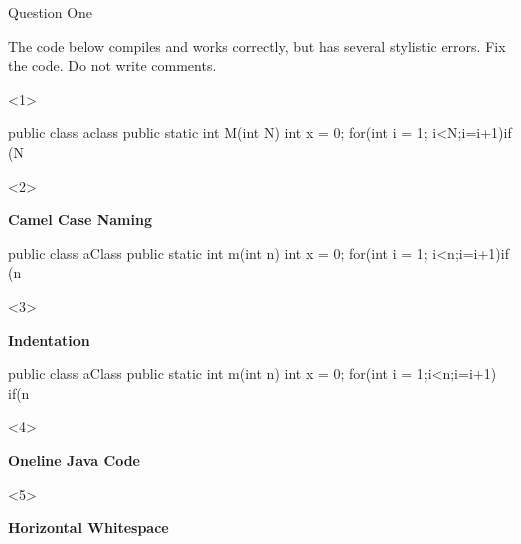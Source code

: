 \begin{frame}[t, fragile]{Question One} \vspace{4pt}

The code below compiles and works correctly, but has several stylistic errors. Fix the code. Do not write comments.

\begin{onlyenv}<1>

\begin{java}
public class aclass {
public static int M(int N) {
	int x = 0;
		for(int i = 1;
		i<N;i=i+1)if
(N%
}}
\end{java}

\end{onlyenv}

\begin{onlyenv}<2>

\textbf{Camel Case Naming}

\begin{java}
public class aClass {
public static int m(int n) {
	int x = 0;
		for(int i = 1;
		i<n;i=i+1)if
(n%
}}
\end{java}

\end{onlyenv}

\begin{onlyenv}<3>

\textbf{Indentation}

\begin{java}
public class aClass {
	public static int m(int n) {
		int x = 0;
		for(int i = 1;i<n;i=i+1)
			if(n%
}}
\end{java}

\end{onlyenv}

\begin{onlyenv}<4>

\textbf{Oneline Java Code}


\end{onlyenv}

\begin{onlyenv}<5>

\textbf{Horizontal Whitespace}


\end{onlyenv}

\end{frame}

